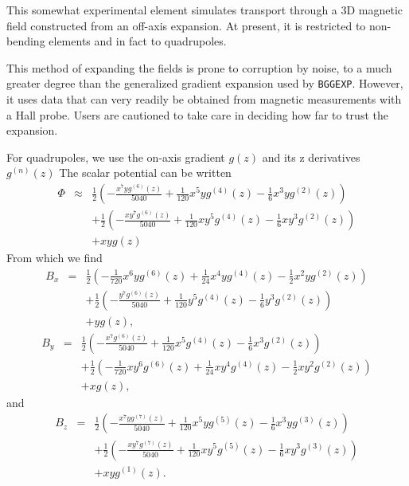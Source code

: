 This somewhat experimental element simulates transport through a 3D magnetic field constructed from
an off-axis expansion.
At present, it is restricted to non-bending elements and in fact to quadrupoles.

This method of expanding the fields is prone to corruption by noise, to a much greater degree than
the generalized gradient expansion used by \verb|BGGEXP|.
However, it uses data that can very readily be obtained from magnetic measurements with a Hall probe.
Users are cautioned to take care in deciding how far to trust the expansion.

For quadrupoles, we use the on-axis gradient $g(z)$ and its z derivatives $g^{(n)}(z)$
The scalar potential can be written 
\begin{eqnarray}
\Phi & \approx & \frac{1}{2} \left(-\frac{x^7 y g^{(6)}(z)}{5040}+\frac{1}{120} x^5 y g^{(4)}(z)-\frac{1}{6} x^3 y g^{(2)}(z)\right) \\
 & &  +\frac{1}{2} \left(-\frac{x y^7 g^{(6)}(z)}{5040}+\frac{1}{120} x y^5 g^{(4)}(z)-\frac{1}{6} x y^3 g^{(2)}(z)\right) \\
 & & + x y g(z)
\end{eqnarray}
From which we find
\begin{eqnarray}
B_x & = & \frac{1}{2} \left(-\frac{1}{720} x^6 y g^{(6)}(z)+\frac{1}{24} x^4 y g^{(4)}(z)-\frac{1}{2} x^2 y g^{(2)}(z)\right) \\
 & & + \frac{1}{2} \left(-\frac{y^7 g^{(6)}(z)}{5040}+\frac{1}{120} y^5 g^{(4)}(z)-\frac{1}{6} y^3 g^{(2)}(z)\right) \\ 
 & & +y g(z),
\end{eqnarray}
\begin{eqnarray}
B_y & = & \frac{1}{2} \left(-\frac{x^7 g^{(6)}(z)}{5040}+\frac{1}{120} x^5 g^{(4)}(z)-\frac{1}{6} x^3 g^{(2)}(z)\right) \\
& & + \frac{1}{2}  \left(-\frac{1}{720} x y^6 g^{(6)}(z)+\frac{1}{24} x y^4 g^{(4)}(z)-\frac{1}{2} x y^2 g^{(2)}(z)\right) \\
& & +x g(z),
\end{eqnarray}
and
\begin{eqnarray}
B_z & = & \frac{1}{2} \left(-\frac{x^7 y g^{(7)}(z)}{5040}+\frac{1}{120} x^5 y g^{(5)}(z)-\frac{1}{6} x^3 y g^{(3)}(z)\right) \\
& &  + \frac{1}{2} \left(-\frac{x y^7 g^{(7)}(z)}{5040}+\frac{1}{120} x y^5 g^{(5)}(z)-\frac{1}{6} x y^3 g^{(3)}(z)\right) \\
& & + x y g^{(1)}(z).
\end{eqnarray}

